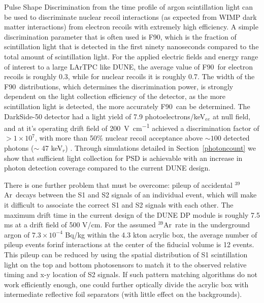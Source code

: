 \documentclass[a4paper,11pt]{article}
\newcommand{\artn}{$^{39}$Ar}
\newcommand{\fnt}{F90}
\begin{document}
Pulse Shape Discrimination from the time profile of argon scintillation light can be used to discriminate nuclear recoil interactions (as expected from WIMP dark matter interactions) from electron recoils with extremely high efficiency. A simple discrimination parameter that is often used is \fnt, which is the fraction of scintillation light that is detected in the first ninety nanoseconds compared to the total amount of scintillation light. For the applied electric fields and energy range of interest to a large LArTPC like DUNE, the average value of \fnt~for electron recoils is roughly 0.3, while for nuclear recoils it is roughly 0.7. The width of the \fnt~distributions, which determines the discrimination power, is strongly dependent on the light collection efficiency of the detector, as the more scintillation light is detected, the more accurately \fnt~can be determined. The DarkSide-50 detector had a light yield of 7.9 photoelectrons/keV$_{ee}$ at null field, and at it's operating drift field of \SI{200}{\volt\per\cm} achieved a discrimination factor of $> 1 \times 10^7$, with more than 50\% nuclear recoil acceptance above $\sim 100$ detected photons ($\sim$ 47 keV$_r$) \cite{darkside50}. Through simulations detailed in Section~\ref{photoncount} we show that sufficient light collection for PSD is achievable with an increase in photon detection coverage compared to the current DUNE design.

There is one further problem that must be overcome: pileup of accidental \artn~decays between the S1 and S2 signals of an individual event, which will make it difficult to associate the correct S1 and S2 signals with each other. The maximum drift time in the current design of the DUNE DP module is roughly 7.5 ms at a drift field of 500 V/cm. For the assumed \artn~rate in the underground argon of $7.3\times10^{-4}$ Bq/kg within the 4.3 kton acrylic box, the average number of pileup events forin{f} interactions at the center of the fiducial volume is 12 events. This pileup can be reduced by using the spatial distribution of S1 scintillation light on the top and bottom photosensors to match it to the observed relative timing and x-y location of S2 signals. If such pattern matching algorithms do not work efficiently enough, one could further optically divide the acrylic box with intermediate reflective foil separators 
(with little effect on the backgrounds).
\end{document}
